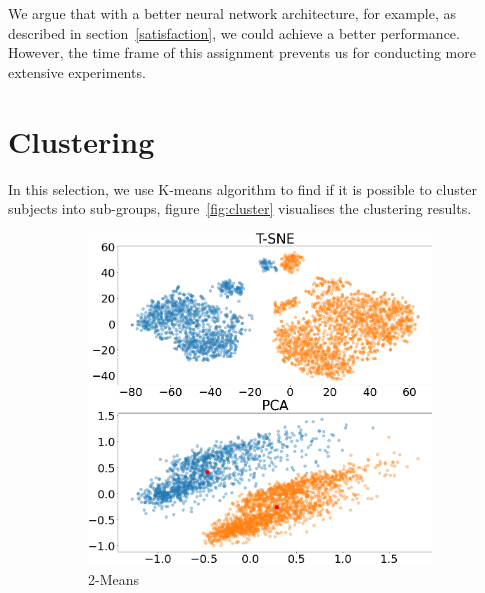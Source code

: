\documentclass[11pt,twocolumn,letterpaper]{article}
\begin{document}
We argue that with a better neural network architecture, for example, as described in section~\ref{satisfaction}, we could achieve a better performance.
However, the time frame of this assignment prevents us for conducting more extensive experiments.

\section{Clustering}

In this selection, we use K-means algorithm to find if it is possible to cluster subjects into sub-groups, figure~\ref{fig:cluster} visualises the clustering results.

\begin{figure}
     \centering
     \begin{subfigure}[b]{0.23\textwidth}
         \centering
         \includegraphics[width=\textwidth]{assests/2-means.png}
         \caption{2-Means}
         \label{fig:cluster:2means}
     \end{subfigure}
     \hfill
     \begin{subfigure}[b]{0.23\textwidth}
         \centering

\end{subfigure}
\end{figure}
\end{document}
